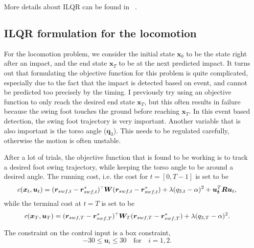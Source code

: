 More details about ILQR can be found in ~\cite{Tassa2012}. 

\subsection{ILQR formulation for the locomotion}
For the locomotion problem, we consider the initial state $\bm{x}_0$ to be the state right after an impact, and the end state $\bm{x}_T$ to be at the next predicted impact. It turns out that formulating the objective function for this problem is quite complicated, especially due to the fact that the impact is detected based on event, and cannot be predicted too precisely by the timing. I previously try using an objective function to only reach the desired end state $\bm{x}_T$, but this often results in failure because the swing foot touches the ground before reaching $\bm{x}_T$. In this event based detection, the swing foot trajectory is very important. Another variable that is also important is the torso angle ($\bm{q}_3$). This needs to be regulated carefully, otherwise the motion is often unstable. 

After a lot of trials, the objective function that is found to be working is to track a desired foot swing trajectory, while keeping the torso angle to be around a desired angle. The running cost, i.e. the cost for $t = [0, T-1] $ is set to be
\begin{equation}
c(\bm{x}_t, \bm{u}_t) = (\bm{r}_{swf, t} - \bm{r}_{swf, t}^*)^{\scriptscriptstyle\top} \bm{W} (\bm{r}_{swf,t} - \bm{r}_{swf, t}^*) + \lambda (q_{3,t} - \alpha)^2 +  \bm{u_t}^T \bm{R} \bm{u}_t,
\end{equation}
while the terminal cost at $t = T$ is set to be 
\begin{equation}
c(\bm{x}_T, \bm{u}_T) = (\bm{r}_{swf, T} - \bm{r}_{swf, T}^*)^{\scriptscriptstyle\top} \bm{W}_T (\bm{r}_{swf, T} - \bm{r}_{swf, T}^*) + \lambda (q_{3,T} - \alpha)^2.
\end{equation}

The constraint on the control input is a box constraint, 
\begin{equation}
-30 \leq \bm{u}_i \leq 30 \quad \text{for} \quad  i = 1, 2 . 
\end{equation}

